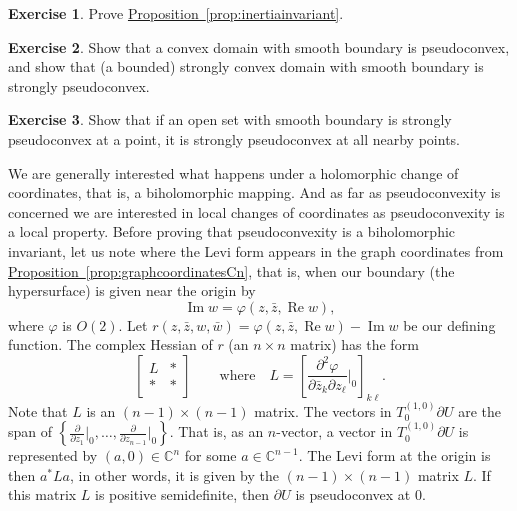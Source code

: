 \documentclass[12pt,openany]{book}
\renewcommand{\Re}{\operatorname{Re}}
\renewcommand{\Im}{\operatorname{Im}}
\newcommand{\C}{{\mathbb{C}}}
\theoremstyle{plain}
\theoremstyle{remark}
\theoremstyle{definition}
\newenvironment{exbox}{%
    \def\FrameCommand{\vrule width 1pt \relax\hspace{10pt}}%
    \MakeFramed{\advance\hsize-\width\FrameRestore}%
}{%
    \endMakeFramed
}
\theoremstyle{exercise}
\newtheorem{exercise}{Exercise}[section]
\theoremstyle{example}
\newcommand{\propref}[1]{\hyperref[#1]{Proposition~\ref*{#1}}}
\begin{document}
\begin{exbox}
\begin{exercise}
Prove \propref{prop:inertiainvariant}.
\end{exercise}

\begin{exercise}
Show that a convex domain with smooth boundary
is pseudoconvex, and show that (a bounded) strongly convex
domain with smooth boundary is strongly pseudoconvex.
\end{exercise}

\begin{exercise}
Show that if an open set with smooth boundary is strongly pseudoconvex at a point, it is strongly
pseudoconvex at all nearby points.
\end{exercise}
\end{exbox}

We are generally interested what happens under a holomorphic change of
coordinates, that is, a biholomorphic mapping.  And as far as pseudoconvexity
is concerned we are interested in local changes of coordinates as
pseudoconvexity is a local property.  Before proving
that pseudoconvexity is a biholomorphic invariant, let us note where the
Levi form appears in the graph coordinates from
\propref{prop:graphcoordinatesCn}, that is, when our boundary (the
hypersurface) is given near the origin by
\begin{equation*}
\Im w = \varphi(z,\bar{z},\Re w) ,
\end{equation*}
where $\varphi$ is $O(2)$.
Let $r(z,\bar{z},w,\bar{w}) = \varphi(z,\bar{z},\Re w) - \Im w$ be our
defining function.  The complex Hessian of $r$ (an $n \times n$ matrix) has the form
\begin{equation*}
\begin{bmatrix}
L & * \\
* & *
\end{bmatrix}
\qquad \text{where} \quad
L = \left[
\frac{\partial^2 \varphi}{\partial \bar{z}_k \partial z_{\ell}}\Big|_0
\right]_{k \ell} .
\end{equation*}
Note that $L$ is an $(n-1) \times (n-1)$ matrix.
The vectors in $T_0^{(1,0)} \partial U$ are the span
of $\left\{
\frac{\partial}{\partial z_1}\big|_0,
\ldots,
\frac{\partial}{\partial z_{n-1}}\big|_0 \right\}$.
That is, as an $n$-vector,
a vector in $T_0^{(1,0)} \partial U$ is represented by $(a,0) \in \C^n$ for
some
$a \in \C^{n-1}$.  The Levi form at the origin is then $a^* L a$,
in other words, it is given by the $(n-1) \times (n-1)$ matrix $L$.
If this matrix $L$ is positive
semidefinite, then $\partial U$ is pseudoconvex at $0$.
\end{document}
